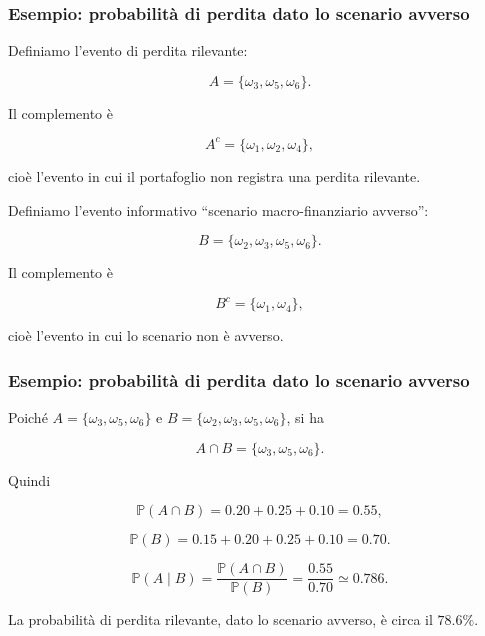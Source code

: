 \documentclass[handout]{beamer}%
\providecommand{\Prob}{\mathbb{P}}
\providecommand{\1}{\mathbf{1}}
\providecommand{\QTR}[2]{\csname #1\endcsname{#2}}
\begin{document}
\begin{frame}%
%

\frametitle{Esempio: probabilit\`{a} di perdita dato lo scenario avverso}%


Definiamo l'evento di perdita rilevante:%

\[
A=\{\omega_{3},\omega_{5},\omega_{6}\}.
\]


Il complemento \`{e}%

\[
A^{c}=\{\omega_{1},\omega_{2},\omega_{4}\},
\]


cio\`{e} l'evento in cui il portafoglio non registra una perdita rilevante.

\medskip

Definiamo l'evento informativo ``scenario macro-finanziario avverso'':%

\[
B=\{\omega_{2},\omega_{3},\omega_{5},\omega_{6}\}.
\]


Il complemento \`{e}%

\[
B^{c}=\{\omega_{1},\omega_{4}\},
\]


cio\`{e} l'evento in cui lo scenario non \`{e} avverso.%

\transboxout
\end{frame}%


%

\begin{frame}%
%

\frametitle{Esempio: probabilit\`{a} di perdita dato lo scenario avverso}%


Poich\'{e} $A=\{\omega_{3},\omega_{5},\omega_{6}\}$ e $B=\{\omega_{2}%
,\omega_{3},\omega_{5},\omega_{6}\}$, si ha%

\[
A\cap B=\{\omega_{3},\omega_{5},\omega_{6}\}.
\]


\medskip

Quindi%

\[
\Prob(A\cap B)=0.20+0.25+0.10=0.55,
\]
%

\[
\Prob(B)=0.15+0.20+0.25+0.10=0.70.
\]
%

\[
\Prob(A\mid B) = \frac{\Prob(A\cap B)}{\Prob(B)} = \frac{0.55}{0.70}
\simeq0.786.
\]


La probabilit\`{a} di perdita rilevante, dato lo scenario avverso, \`{e} circa
il $78.6\%$.%

\transboxout
\end{frame}%
\end{document}
